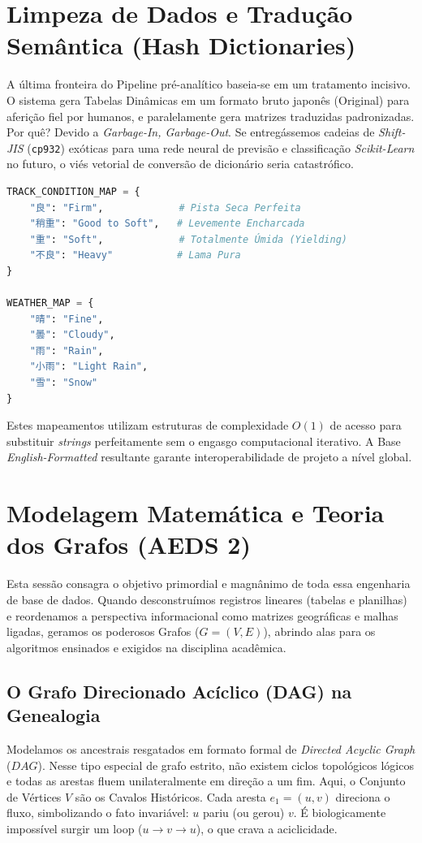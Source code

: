 \documentclass[12pt,a4paper]{article}
\begin{document}
\section{Limpeza de Dados e Tradução Semântica (Hash Dictionaries)}
A última fronteira do Pipeline pré-analítico baseia-se em um tratamento incisivo.
O sistema gera Tabelas Dinâmicas em um formato bruto japonês (Original) para aferição fiel por humanos, e paralelamente gera matrizes traduzidas padronizadas. Por quê? Devido a \textit{Garbage-In, Garbage-Out}. Se entregássemos cadeias de \textit{Shift-JIS} (\texttt{cp932}) exóticas para uma rede neural de previsão e classificação \textit{Scikit-Learn} no futuro, o viés vetorial de conversão de dicionário seria catastrófico.

\begin{lstlisting}[language=Python, caption=Dicionário Estático de Matrizes O(1) de Tradução e Conversão]
TRACK_CONDITION_MAP = {
    "良": "Firm",             # Pista Seca Perfeita
    "稍重": "Good to Soft",   # Levemente Encharcada
    "重": "Soft",             # Totalmente Úmida (Yielding)
    "不良": "Heavy"           # Lama Pura
}

WEATHER_MAP = {
    "晴": "Fine", 
    "曇": "Cloudy", 
    "雨": "Rain", 
    "小雨": "Light Rain", 
    "雪": "Snow"
}
\end{lstlisting}

Estes mapeamentos utilizam estruturas de complexidade $O(1)$ de acesso para substituir \textit{strings} perfeitamente sem o engasgo computacional iterativo. A Base \textit{English-Formatted} resultante garante interoperabilidade de projeto a nível global.

\section{Modelagem Matemática e Teoria dos Grafos (AEDS 2)}
Esta sessão consagra o objetivo primordial e magnânimo de toda essa engenharia de base de dados. Quando desconstruímos registros lineares (tabelas e planilhas) e reordenamos a perspectiva informacional como matrizes geográficas e malhas ligadas, geramos os poderosos Grafos ($G=(V, E)$), abrindo alas para os algoritmos ensinados e exigidos na disciplina acadêmica.

\subsection{O Grafo Direcionado Acíclico (DAG) na Genealogia}
Modelamos os ancestrais resgatados em formato formal de \textit{Directed Acyclic Graph} ($DAG$). Nesse tipo especial de grafo estrito, não existem ciclos topológicos lógicos e todas as arestas fluem unilateralmente em direção a um fim.
Aqui, o Conjunto de Vértices $V$ são os Cavalos Históricos. Cada aresta $e_{1}=(u, v)$ direciona o fluxo, simbolizando o fato invariável: $u$ pariu (ou gerou) $v$. É biologicamente impossível surgir um loop ($u \to v \to u$), o que crava a aciclicidade.
\end{document}
